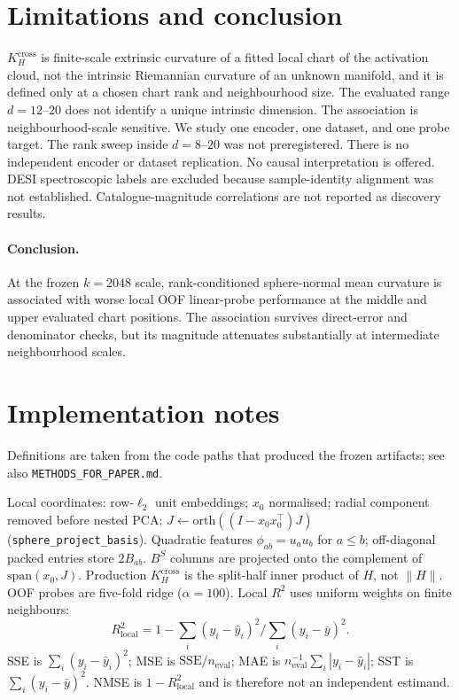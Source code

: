 \documentclass[mlabstract]{jmlr}
\begin{document}
\section{Limitations and conclusion}
\label{sec:limit}

$K_{H}^{\mathrm{cross}}$ is finite-scale extrinsic curvature of a fitted local chart of the activation cloud, not the intrinsic Riemannian curvature of an unknown manifold, and it is defined only at a chosen chart rank and neighbourhood size. The evaluated range $d{=}12$--$20$ does not identify a unique intrinsic dimension. The association is neighbourhood-scale sensitive. We study one encoder, one dataset, and one probe target. The rank sweep inside $d{=}8$--$20$ was not preregistered. There is no independent encoder or dataset replication. No causal interpretation is offered. DESI spectroscopic labels are excluded because sample-identity alignment was not established. Catalogue-magnitude correlations are not reported as discovery results.

\paragraph{Conclusion.}
At the frozen $k{=}2048$ scale, rank-conditioned sphere-normal mean curvature is associated with worse local OOF linear-probe performance at the middle and upper evaluated chart positions. The association survives direct-error and denominator checks, but its magnitude attenuates substantially at intermediate neighbourhood scales.

\clearpage


\clearpage
\appendix
%
\section{Implementation notes}
\label{app:methods}

Definitions are taken from the code paths that produced the frozen artifacts; see also \texttt{METHODS\_FOR\_PAPER.md}.

Local coordinates: row-$\ell_2$ unit embeddings; $x_0$ normalised; radial component removed before nested PCA; $J\leftarrow\mathrm{orth}((I-x_0x_0^\top)J)$ (\texttt{sphere\_project\_basis}). Quadratic features $\phi_{ab}=u_au_b$ for $a\le b$; off-diagonal packed entries store $2B_{ab}$. $B^S$ columns are projected onto the complement of $\mathrm{span}(x_0,J)$. Production $K_H^{\mathrm{cross}}$ is the split-half inner product of $H$, not $\|H\|$. OOF probes are five-fold ridge ($\alpha{=}100$). Local $R^2$ uses uniform weights on finite neighbours:
\[
R^{2}_{\mathrm{local}}=1-\sum_i(y_i-\hat y_i)^2\Big/\sum_i(y_i-\bar y)^2.
\]
SSE is $\sum_i(y_i-\hat y_i)^2$; MSE is $\mathrm{SSE}/n_{\mathrm{eval}}$; MAE is $n_{\mathrm{eval}}^{-1}\sum_i|y_i-\hat y_i|$; SST is $\sum_i(y_i-\bar y)^2$. NMSE is $1-R^{2}_{\mathrm{local}}$ and is therefore not an independent estimand.
\end{document}
